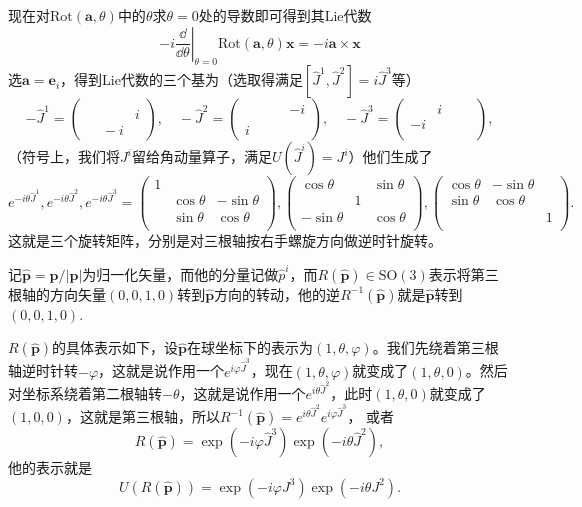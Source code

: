 现在对$\mathrm{Rot}(\bm{a},\theta)$中的$\theta$求$\theta=0$处的导数即可得到其Lie代数
\[
-i\left.\frac{\dd}{\dd \theta}\right|_{\theta=0}\mathrm{Rot}(\bm{a},\theta)\bm{x}=-i\bm{a}\times\bm{x}
\]
选$\bm{a}=\bm{e}_i$，得到Lie代数的三个基为（选取得满足$[\hat{J}^1,\hat{J}^2]=i\hat{J}^3$等）
\[
-\hat{J}^1=\begin{pmatrix}
		&&\\
		&&i\\
		&\phantom{l}-i&
	 \end{pmatrix},\quad
-\hat{J}^2=\begin{pmatrix}
		&&-i\\
		&&\\
		i\phantom{-}&&
	 \end{pmatrix},\quad
-\hat{J}^3=\begin{pmatrix}
		&i\phantom{-}&\\
		-i&&\\
		&&
	 \end{pmatrix},
\]
（符号上，我们将$J^i$留给角动量算子，满足$U(\hat{J}^i)=J^i$）他们生成了
\[
e^{-i\theta \hat{J}^1},e^{-i\theta \hat{J}^2},e^{-i\theta \hat{J}^3}=
\begin{pmatrix}
 1 && \\
 & \cos \theta& -\sin \theta \\
 & \sin \theta & \cos \theta \\
\end{pmatrix}
,
\begin{pmatrix}
\cos \theta & &\sin \theta\\
 & 1 & \\
-\sin \theta & & \cos \theta \\
\end{pmatrix}
,
\begin{pmatrix}
\cos \theta & -\sin \theta &\\
\sin \theta&\cos \theta &\\
 & & 1 \\
\end{pmatrix}.
\]
这就是三个旋转矩阵，分别是对三根轴按右手螺旋方向做逆时针旋转。

记$\hat{\bm{p}}=\bm{p}/|\bm{p}|$为归一化矢量，而他的分量记做$\hat{p}^i$，而$R(\hat{\bm{p}})\in\mathrm{SO}(3)$表示将第三根轴的方向矢量$(0,0,1,0)$转到$\hat{\bm{p}}$方向的转动，他的逆$R^{-1}(\hat{\bm{p}})$就是$\hat{\bm{p}}$转到$(0,0,1,0)$.

$R(\hat{\bm{p}})$的具体表示如下，设$\hat{\bm{p}}$在球坐标下的表示为$(1,\theta,\varphi)$。我们先绕着第三根轴逆时针转$-\varphi$，这就是说作用一个$e^{i\varphi \hat{J}^3}$，现在$(1,\theta,\varphi)$就变成了$(1,\theta,0)$。然后对坐标系绕着第二根轴转$-\theta$，这就是说作用一个$e^{i\theta \hat{J}^2}$，此时$(1,\theta,0)$就变成了$(1,0,0)$，这就是第三根轴，所以$R^{-1}(\hat{\bm{p}})=e^{i\theta \hat{J}^2}e^{i\varphi \hat{J}^3}$，
或者
\[
	R(\hat{\bm{p}})=\exp(-i\varphi \hat{J}^3)\exp(-i\theta \hat{J}^2),
\]
他的表示就是
\[
	U(R(\hat{\bm{p}}))=\exp(-i\varphi J^3)\exp(-i\theta J^2).
\]

